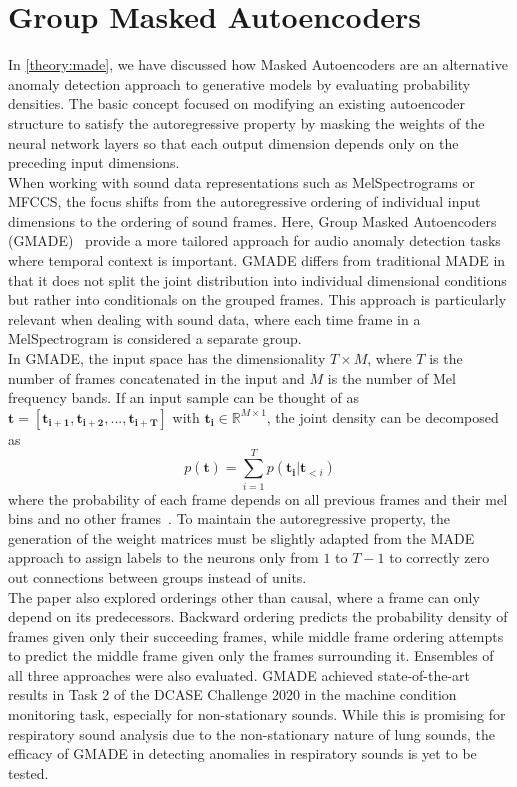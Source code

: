 \section{Group Masked Autoencoders}
In \autoref{theory:made}, we have discussed how Masked Autoencoders are an alternative anomaly detection approach to generative models by evaluating probability densities. The basic concept focused on modifying an existing autoencoder structure to satisfy the autoregressive property by masking the weights of the neural network layers so that each output dimension depends only on the preceding input dimensions.\\
When working with sound data representations such as MelSpectrograms or MFCCS, the focus shifts from the autoregressive ordering of individual input dimensions to the ordering of sound frames. Here, Group Masked Autoencoders (GMADE)~\cite{Giri2020} provide a more tailored approach for audio anomaly detection tasks where temporal context is important. GMADE differs from traditional MADE in that it does not split the joint distribution into individual dimensional conditions but rather into conditionals on the grouped frames. This approach is particularly relevant when dealing with sound data, where each time frame in a MelSpectrogram is considered a separate group.\\
In GMADE, the input space has the dimensionality $T\times M$, where $T$ is the number of frames concatenated in the input and $M$ is the number of Mel frequency bands. If an input sample can be thought of as $\mathbf{t}=[\mathbf{t_{i+1}}, \mathbf{t_{i+2}},... ,\mathbf{t_{i+T}}]$ with $\mathbf{t_{i}}\in \mathbb{R}^{M\times 1}$, the joint density can be decomposed as \[ p(\mathbf{t})=\sum_{i=1}^{T}p(\mathbf{t_i}|\mathbf{t}_{<i}) \] where the probability of each frame depends on all previous frames and their mel bins and no other frames~\cite{Giri2020}. To maintain the autoregressive property, the generation of the weight matrices must be slightly adapted from the MADE approach to assign labels to the neurons only from $1$ to $T-1$ to correctly zero out connections between groups instead of units.\\
The paper also explored orderings other than causal, where a frame can only depend on its predecessors. Backward ordering predicts the probability density of frames given only their succeeding frames, while middle frame ordering attempts to predict the middle frame given only the frames surrounding it. Ensembles of all three approaches were also evaluated. GMADE achieved state-of-the-art results in Task 2 of the DCASE Challenge 2020 in the machine condition monitoring task, especially for non-stationary sounds. While this is promising for respiratory sound analysis due to the non-stationary nature of lung sounds, the efficacy of GMADE in detecting anomalies in respiratory sounds is yet to be tested.\\

